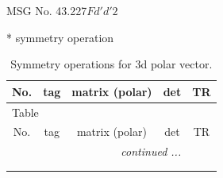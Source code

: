 \documentclass[fleqn,8pt]{jsarticle}
\begin{document}
\setcounter{MaxMatrixCols}{32}

\renewcommand{\tablename}{Table~}
\renewcommand{\figurename}{Figure~}
\begin{center}
\LARGE
MSG No. 43.227\quad$Fd'd'2$
\end{center}
* symmetry operation
\renewcommand{\arraystretch}{1.3}
\begin{longtable}{ccccc}
\caption{Symmetry operations for 3d polar vector.}
 \\
 \hline \hline
No. & tag & matrix (polar) & det & TR \\ \hline \endfirsthead

\multicolumn{4}{l}{\tablename\ \thetable{}} \\
 \hline \hline
No. & tag & matrix (polar) & det & TR \\ \hline \endhead

 \hline \hline
\multicolumn{4}{r}{\footnotesize\it continued ...} \\ \endfoot

 \hline \hline
\multicolumn{4}{r}{} \\ \endlastfoot


\end{longtable}
\end{document}
